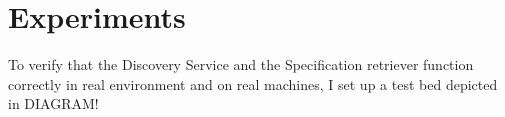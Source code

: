 \section{Experiments}

To verify that the Discovery Service and the Specification retriever function correctly in real environment and on real machines, I set up a test bed depicted in DIAGRAM!